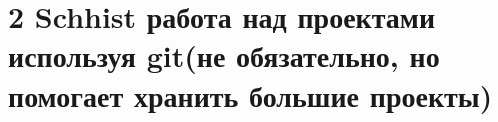 \chapter{2 Schhist работа над проектами используя git(не обязательно, но помогает хранить большие проекты)}
